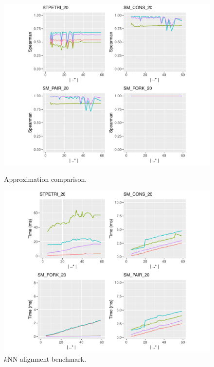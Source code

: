 \begin{figure}[!t]
\begin{minipage}{.49\textwidth}

	\includegraphics[width=1.1\textwidth]{images/Prec.pdf}
	\caption{Approximation comparison.}\label{fig:app}
\end{minipage}\hfill \begin{minipage}{.49\textwidth}

	\includegraphics[width=1.1\textwidth]{images/kronos.pdf}
	\caption{$k$NN alignment benchmark.}\label{fig:kronos}
\end{minipage}
\end{figure}
